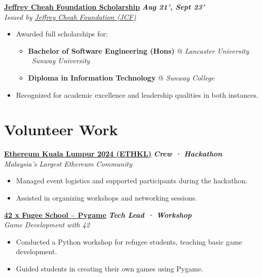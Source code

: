 \documentclass[letterpaper,10pt]{article}
\newcommand{\heading}[2]{
  \hspace{4pt}#1\hfill#2\\
}
\newcommand{\headingBf}[2]{
  \heading{\textbf{#1}}{
    \textbf{\textit{\small{#2}}}
  }
}
\newenvironment{bulletList}{
  \begin{itemize}[itemsep=1pt, parsep=1pt, leftmargin=26pt]
}{
  \end{itemize}
}
\newcommand{\oneFrag}[4]{
  \headingBf{#1}{#2}
  \hspace{6pt}\textit{#3}
  \vspace{-4pt}
  #4
}
\newenvironment{nestedBulletList}{
  \begin{itemize}[itemsep=1pt, parsep=1pt, leftmargin=14pt]
}{
  \end{itemize}
}
\begin{document}
\vspace{2pt}
\oneFrag{
  \href{https://scholarship.sunway.edu.my/scholarship/jeffrey-cheah-foundation-scholarship}{Jeffrey Cheah Foundation Scholarship}
}{
  Aug 21', Sept 23'
}{
  Issued by
  \href{https://jeffreycheah.foundation}{Jeffrey Cheah Foundation (JCF)}
}{
  \begin{bulletList}
    \item Awarded full scholarships for:
    \vspace{-4pt}
    \begin{nestedBulletList}
      \item
      \textbf{Bachelor of Software Engineering (Hons)} @
      \textit{Lancaster University \textbar\ Sunway University}
      \item
      \textbf{Diploma in Information Technology} @
      \textit{Sunway College}
    \end{nestedBulletList}
    \item Recognized for academic excellence and leadership qualities in both instances.
  \end{bulletList}
}


\section{Volunteer Work}

\oneFrag{
  \href{https://www.2024.ethkl.org}{Ethereum Kuala Lumpur 2024 (ETHKL)}
}{
  Crew · Hackathon
}{
  Malaysia's Largest Ethereum Community
}{
  \begin{bulletList}
    \item Managed event logistics and supported participants during the hackathon.
    \item Assisted in organizing workshops and networking sessions.
  \end{bulletList}
}

\vspace{2pt}
\oneFrag{
  \href{https://www.linkedin.com/feed/update/urn:li:activity:7219932643142901760}{42 x Fugee School -- Pygame}
}{
  Tech Lead · Workshop
}{
  Game Development with 42
}{
  \begin{bulletList}
    \item Conducted a Python workshop for refugee students, teaching basic game development.
    \item Guided students in creating their own games using Pygame.
  \end{bulletList}
}
\end{document}
